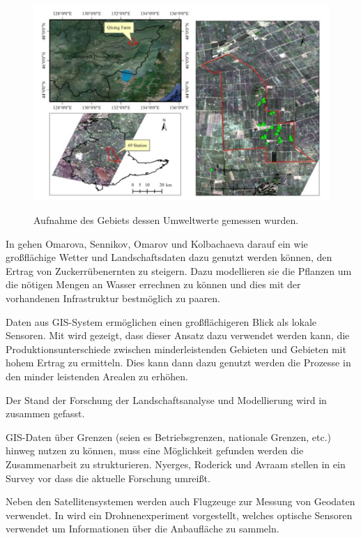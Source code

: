 \begin{figure}[h]
 \includegraphics[scale=0.4,natwidth=\textwidth]{figures/sensors/satellite_area.png}
 \centering
 \label{fig:satellite_area}
 \caption{Aufnahme des Gebiets dessen Umweltwerte gemessen wurden. \cite{jour:Huang2013}}
\end{figure}

In \cite{jour:Omarova2013} gehen Omarova, Sennikov, Omarov und Kolbachaeva darauf ein wie großflächige Wetter und Landschaftsdaten dazu genutzt werden können, den Ertrag von Zuckerrübenernten zu steigern. Dazu modellieren sie die Pflanzen um die nötigen Mengen an Wasser errechnen zu können und dies mit der vorhandenen Infrastruktur bestmöglich zu paaren.

Daten aus GIS-System ermöglichen einen großflächigeren Blick als lokale Sensoren. Mit \cite{book:Hou2013} wird gezeigt, dass dieser Ansatz dazu verwendet werden kann, die Produktionsunterschiede zwischen minderleistenden Gebieten und Gebieten mit hohem Ertrag zu ermitteln. Dies kann dann dazu genutzt werden die Prozesse in den minder leistenden Arealen zu erhöhen.

Der Stand der Forschung der Landschaftsanalyse und Modellierung wird in \cite{jour:Zhou2013} zusammen gefasst.

GIS-Daten über Grenzen (seien es Betriebsgrenzen, nationale Grenzen, etc.) hinweg nutzen zu können, muss eine Möglichkeit gefunden werden die Zusammenarbeit zu strukturieren. Nyerges, Roderick und Avraam stellen in \cite{jour:Nyerges2013} ein Survey vor dass die aktuelle Forschung umreißt. 

Neben den Satellitensystemen werden auch Flugzeuge zur Messung von Geodaten verwendet. In \cite{jour:Honkavaara2012} wird ein Drohnenexperiment vorgestellt, welches optische Sensoren verwendet um Informationen über die Anbaufläche zu sammeln.